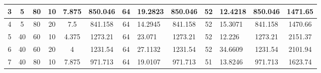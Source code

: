 \documentclass[12pt, a4paper]{article}
\begin{document}
\begin{table}[H]
\begin{tabular}{|c|c|c|c|c|c|c|l|c|c|l|c|c|}
	3                  & 5                                                  & 80                          & 10                          & 7.875                 & 850.046  & 64                                                                      & 19.2823                                                & 850.046  & 52                                                                      & 12.4218                                                & 850.046                         & 1471.65                         \\ \hline
	4                  & 5                                                  & 80                          & 20                          & 7.5                   & 841.158  & 64                                                                      & 14.2945                                                & 841.158  & 52                                                                      & 15.3071                                                & 841.158                         & 1470.66                         \\ \hline
	5                  & 40                                                 & 60                          & 10                          & 4.375                 & 1273.21  & 64                                                                      & 23.071                                                 & 1273.21  & 52                                                                      & 12.226                                                 & 1273.21                         & 2151.37                         \\ \hline
	6                  & 40                                                 & 60                          & 20                          & 4                     & 1231.54  & 64                                                                      & 27.1132                                                & 1231.54  & 52                                                                      & 34.6609                                                & 1231.54                         & 2101.94                         \\ \hline
	7                  & 40                                                 & 80                          & 10                          & 7.875                 & 971.713  & 64                                                                      & 19.0107                                                & 971.713  & 51                                                                      & 13.8246                                                & 971.713                         & 1623.74                         \\ \hline

\end{tabular}
\end{table}
\end{document}
